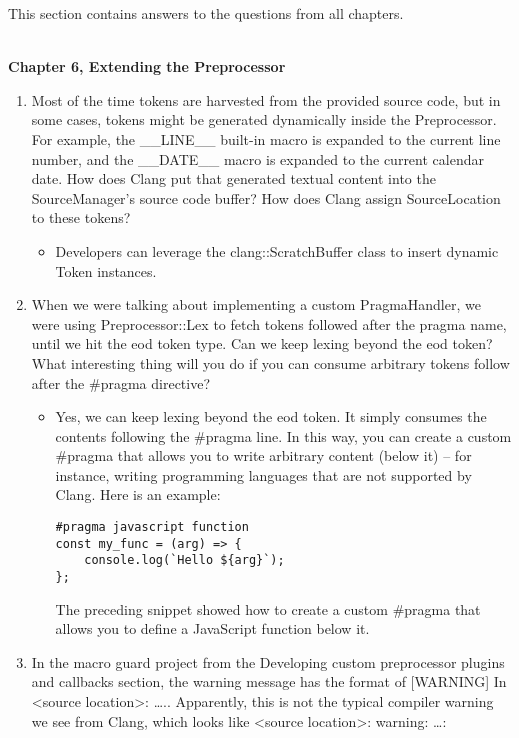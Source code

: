 

This section contains answers to the questions from all chapters.

\hspace*{\fill} \\ %
\noindent
\textbf{Chapter 6, Extending the Preprocessor}

\begin{enumerate}
\item Most of the time tokens are harvested from the provided source code, but in some cases, tokens might be generated dynamically inside the Preprocessor. For example, the \_\_LINE\_\_ built-in macro is expanded to the current line number, and the \_\_DATE\_\_ macro is expanded to the current calendar date. How does Clang put that generated textual content into the SourceManager's source code buffer? How does Clang assign SourceLocation to these tokens?

\begin{itemize}
\item Developers can leverage the clang::ScratchBuffer class to insert dynamic Token instances.
\end{itemize}

\item When we were talking about implementing a custom PragmaHandler, we were using Preprocessor::Lex to fetch tokens followed after the pragma name, until we hit the eod token type. Can we keep lexing beyond the eod token? What interesting thing will you do if you can consume arbitrary tokens follow after the \#pragma directive?

\begin{itemize}
\item Yes, we can keep lexing beyond the eod token. It simply consumes the contents following the \#pragma line. In this way, you can create a custom \#pragma that allows you to write arbitrary content (below it) – for instance, writing programming languages that are not supported by Clang. Here is an example:

\begin{lstlisting}[style=styleCXX]
#pragma javascript function
const my_func = (arg) => {
	console.log(`Hello ${arg}`);
};
\end{lstlisting}

The preceding snippet showed how to create a custom \#pragma that allows you to define a JavaScript function below it.
\end{itemize}

\item In the macro guard project from the Developing custom preprocessor plugins and callbacks section, the warning message has the format of [WARNING] In <source location>: ….. Apparently, this is not the typical compiler warning we see from Clang, which looks like <source location>: warning: …:


\end{enumerate}
